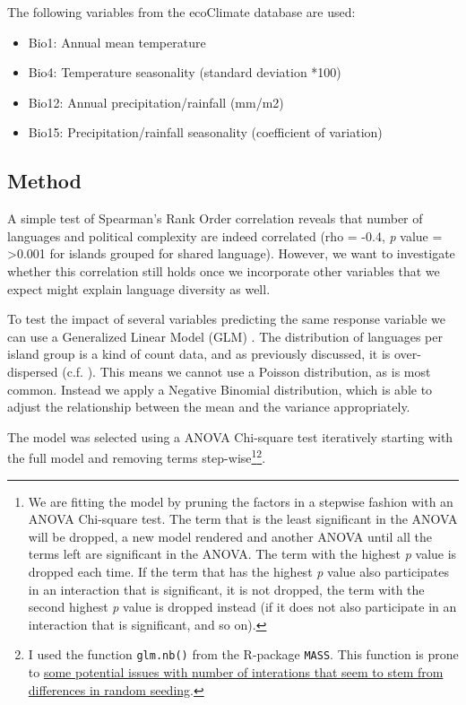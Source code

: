 \documentclass[a4paper,10pt]{article} %
\begin{document}
The following variables from the ecoClimate database are used:

\begin{itemize}
\item Bio1: Annual mean temperature
\item Bio4: Temperature seasonality (standard deviation *100)
\item Bio12: Annual precipitation/rainfall (mm/m2)
\item Bio15: Precipitation/rainfall seasonality (coefficient of variation)
\end{itemize}


\subsection{Method}
\label{pol_complex_method}
A simple test of Spearman's Rank Order correlation reveals that number of languages and political complexity are indeed correlated (rho  = -0.4, \emph{p} value = >0.001 for islands grouped for shared language). However, we want to investigate whether this correlation still holds once we incorporate other variables that we expect might explain language diversity as well.

To test the impact of several variables predicting the same response variable we can use a Generalized Linear Model (GLM) \citep{venables2002modern}. The distribution of languages per island group is a kind of count data, and as previously discussed, it is over-dispersed (c.f. \citet[4-5]{gavin2012island}). This means we cannot use a Poisson distribution, as is most common. Instead we apply a Negative Binomial distribution, which is able to adjust the relationship between the mean and the variance appropriately. 

The model was selected using a ANOVA Chi-square test iteratively starting with the full model and removing terms step-wise\footnote{We are fitting the model by pruning the factors in a stepwise fashion with an ANOVA Chi-square test. The term that is the least significant in the ANOVA will be dropped, a new model rendered and another ANOVA until all the terms left are significant in the ANOVA. The term with the highest \emph{p} value is dropped each time. If the term that has the highest \emph{p} value also participates in an interaction that is significant, it is not dropped, the term with the second highest \emph{p} value is dropped instead (if it does not also participate in an interaction that is significant, and so on).}\footnote{I used the function \texttt{glm.nb()} from the R-package \texttt{MASS}. This function is prone to \href{https://stackoverflow.com/questions/11749977/why-does-glm-nb-throw-a-missing-value-error-only-on-very-specific-inputs}{some potential issues with number of interations that seem to stem from differences in random seeding}.}.
\end{document}
